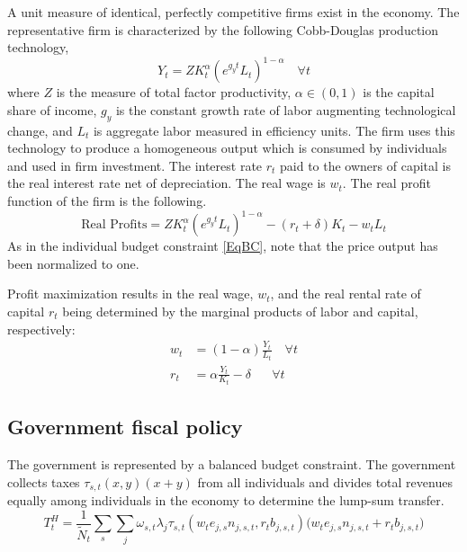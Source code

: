 \documentclass[letterpaper,12pt]{article}
\theoremstyle{definition}
\begin{document}
\begin{spacing}{1.5}
    A unit measure of identical, perfectly competitive firms exist in the economy. The representative firm is characterized by the following Cobb-Douglas production technology,
    \begin{equation}\label{EqCobbDougProd}
       Y_t = Z K_t^\alpha\left(e^{g_y t}L_t\right)^{1-\alpha} \quad \forall t
    \end{equation}
    where $Z$ is the measure of total factor productivity, $\alpha\in(0,1)$ is the capital share of income, $g_y$ is the constant growth rate of labor augmenting technological change, and $L_t$ is aggregate labor measured in efficiency units. The firm uses this technology to produce a homogeneous output which is consumed by individuals and used in firm investment.  The interest rate $r_t$ paid to the owners of capital is the real interest rate net of depreciation. The real wage is $w_t$.  The real profit function of the firm is the following.
    \begin{equation}\label{EqFirmProfit}
       \text{Real Profits} = Z K_t^\alpha\left(e^{g_y t}L_t\right)^{1-\alpha} - (r_t + \delta)K_t - w_t L_t
    \end{equation}
    As in the individual budget constraint \eqref{EqBC}, note that the price output has been normalized to one.

    Profit maximization results in the real wage, $w_t$, and the real rental rate of capital $r_t$ being determined by the marginal products of labor and capital, respectively:
    \begin{align}
       w_t &= (1-\alpha)\frac{Y_t}{L_t} \quad \forall t \label{EqFOCwage}\\
       r_t &= \alpha\frac{Y_t}{K_t} - \delta \quad\:\:\: \forall t \label{EqFOCrate}
    \end{align}


  \subsection{Government fiscal policy}\label{SecGovt}

    The government is represented by a balanced budget constraint. The government collects taxes $\tau_{s,t}(x,y)(x+y)$ from all individuals and divides total revenues equally among individuals in the economy to determine the lump-sum transfer.
    \begin{equation}\label{EqGovtBC}
      T^H_t = \frac{1}{\tilde N_t} \sum_s \sum_j \omega_{s,t}\lambda_j\tau_{s,t}(w_t e_{j,s}n_{j,s,t}, r_t b_{j,s,t})\bigl(w_t e_{j,s}n_{j,s,t} + r_t b_{j,s,t}\bigr)
    \end{equation}


\end{spacing}
\end{document}
